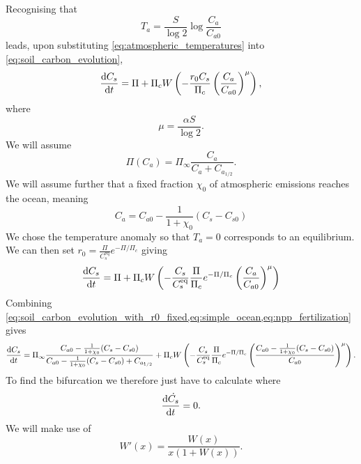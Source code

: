 Recognising that
\begin{equation}
  \label{eq:atmospheric_temperatures}
  T_a = \frac{S}{\log 2} \log \frac{C_a}{C_{a0}} 
\end{equation}
leads, upon substituting \cref{eq:atmospheric_temperatures} into \cref{eq:soil_carbon_evolution},
\begin{equation}
  \label{eq:global_soil_carbon}
  \dv{C_s}{t} = \Pi + \Pi_c W\left(-\frac{r_0C_s}{\Pi_c} \left(\frac{C_a}{C_{a0}}\right)^\mu \right),
\end{equation}
where
\begin{equation}
  \label{eq:mu}
  \mu = \frac{\alpha S}{\log 2}.
\end{equation}
We will assume
\begin{equation}
  \label{eq:npp_fertilization}
  \Pi(C_a) = \Pi_{\infty}\frac{C_a}{C_a + C_{a_{1/2}}}.
\end{equation}
We will assume further that a fixed fraction $\chi_0$ of atmospheric emissions reaches the ocean, meaning
\begin{equation}
  \label{eq:simple_ocean}
  C_a = C_{a0} -\frac{1}{1+\chi_0} (C_s - C_{s0})
\end{equation}
We chose the temperature anomaly so that $T_a = 0$ corresponds to an equilibrium. We can then set
$r_0 = \frac{\Pi}{C_s^{\mathrm{eq}}}e^{-\Pi/\Pi_c}$ giving
\begin{equation}
  \label{eq:soil_carbon_evolution_with_r0_fixed}
  \dv{C_s}{t} = \Pi + \Pi_c W\left(-\frac{C_s}{C_s^{\mathrm{eq}}}\frac{\Pi}{\Pi_c}e^{-\Pi/\Pi_c} \left(\frac{C_a}{C_{a0}}\right)^\mu \right)
\end{equation}
Combining \cref{eq:soil_carbon_evolution_with_r0_fixed,eq:simple_ocean,eq:npp_fertilization} gives
\begin{equation}
  \label{eq:soil_carbon_evolution_combined}
  \dv{C_s}{t} = \Pi_{\infty}\frac{C_{a0} -\frac{1}{1+\chi_0} (C_s - C_{s0})}{C_{a0} -\frac{1}{1+\chi_0} (C_s - C_{s0})+ C_{a_{1/2}}}
  + \Pi_c W\left(-\frac{C_s}{C_s^{\mathrm{eq}}}\frac{\Pi}{\Pi_c}e^{-\Pi/\Pi_c} \left(\frac{C_{a0} -\frac{1}{1+\chi_0} (C_s - C_{s0})}{C_{a0}}\right)^\mu \right).
\end{equation}
To find the bifurcation we therefore just have to calculate where
\begin{equation*}
  \dv{\dot{C_s}}{t} = 0.
\end{equation*}
We will make use of
\begin{equation}
  \label{eq:derivative_of_lambert_W}
  W'(x) = \frac{W(x)}{x\left(1 + W\left(x\right)\right)}.
\end{equation}